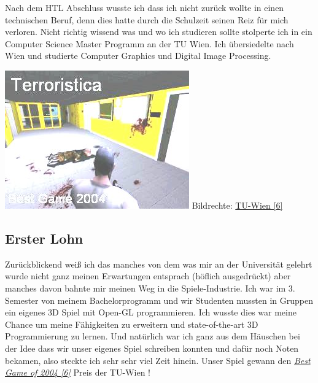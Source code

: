\documentclass[10pt,a4paper,ngerman,twoside]{article} %
\begin{document}
\begin{multicols}{3}
Nach dem HTL Abschluss wusste ich dass ich nicht zurück wollte in einen technischen Beruf, denn dies hatte durch die Schulzeit seinen Reiz für mich verloren. Nicht richtig wissend was und wo ich studieren sollte stolperte ich in ein Computer Science Master Programm an der TU Wien. Ich übersiedelte nach Wien und studierte Computer Graphics und Digital Image Processing.
\begin{center}
    \includegraphics[width=\linewidth]{austrianguy/austrianguy-bestgame2004.jpg}
    \footnotesize{Bildrechte: \href{http://www.cg.tuwien.ac.at/courses/CG23/HallOfFame/2004/}{TU-Wien [6]}}
\end{center}
\subsection*{Erster Lohn}

Zurückblickend weiß ich das manches von dem was mir an der Universität gelehrt wurde nicht ganz meinen Erwartungen entsprach (höflich ausgedrückt) aber manches davon bahnte mir meinen Weg in die Spiele-Industrie. Ich war im 3. Semester von meinem Bachelorprogramm und wir Studenten mussten in Gruppen ein eigenes 3D Spiel mit Open-GL programmieren. Ich wusste dies war meine Chance um meine Fähigkeiten zu erweitern und state-of-the-art 3D Programmierung zu lernen. Und natürlich war ich ganz aus dem Häuschen bei der Idee dass wir unser eigenes Spiel schreiben konnten und dafür noch Noten bekamen, also steckte ich sehr sehr viel Zeit hinein. Unser Spiel gewann den \href{http://www.cg.tuwien.ac.at/courses/CG23/HallOfFame/2004/}{\textit{Best Game of 2004 [6]}} Preis der TU-Wien !


\end{multicols}
\end{document}
